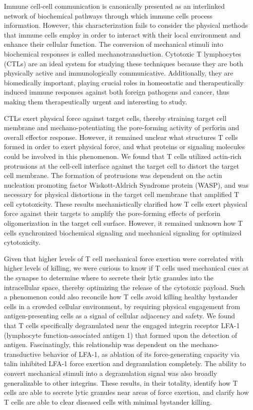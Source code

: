 Immune cell-cell communication is canonically presented as an interlinked network of biochemical pathways through which immune cells process information. However, this characterization fails to consider the physical methods that immune cells employ in order to interact with their local environment and enhance their cellular function. The conversion of mechanical stimuli into biochemical responses is called mechanotransduction. Cytotoxic T lymphocytes (CTLs) are an ideal system for studying these techniques because they are both physically active and immunologically communicative. Additionally, they are biomedically important, playing crucial roles in homeostatic and therapeutically induced immune responses against both foreign pathogens and cancer, thus making them therapeutically urgent and interesting to study.

CTLs exert physical force against target cells, thereby straining target cell membrane and mechano-potentiating the pore-forming activity of perforin and overall effector response. However, it remained unclear what structures T cells formed in order to exert physical force, and what proteins or signaling molecules could be involved in this phenomenon. We found that T cells utilized actin-rich protrusions at the cell-cell interface against the target cell to distort the target cell membrane. The formation of protrusions was dependent on the actin nucleation promoting factor Wiskott-Aldrich Syndrome protein (WASP), and was necessary for physical distortions in the target cell membrane that amplified T cell cytotoxicity. These results mechanistically clarified how T cells exert physical force against their targets to amplify the pore-forming effects of perforin oligomerization in the target cell surface. However, it remained unknown how T cells synchronized biochemical signaling and mechanical signaling for optimized cytotoxicity.

Given that higher levels of T cell mechanical force exertion were correlated with higher levels of killing, we were curious to know if T cells used mechanical cues at the synapse to determine where to secrete their lytic granules into the intracellular space, thereby optimizing the release of the cytotoxic payload. Such a phenomenon could also reconcile how T cells avoid killing healthy bystander cells in a crowded cellular environment, by requiring physical engagement from antigen-presenting cells as a signal of cellular adjacency and safety. We found that T cells specifically degranulated near the engaged integrin receptor LFA-1 (lymphocyte function-associated antigen 1) that formed upon the detection of antigen. Fascinatingly, this relationship was dependent on the mechano-transductive behavior of LFA-1, as ablation of its force-generating capacity via talin inhibited LFA-1 force exertion and degranulation completely. The ability to convert mechanical stimuli into a degranulation signal was also broadly generalizable to other integrins. These results, in their totality, identify how T cells are able to secrete lytic granules near areas of force exertion, and clarify how T cells are able to clear diseased cells with minimal bystander killing.

